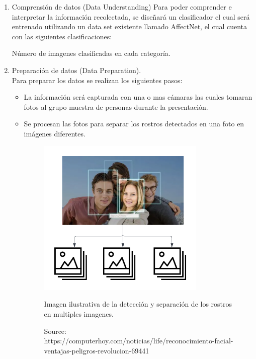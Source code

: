 \begin{enumerate}
      \item Comprensión de datos (Data Understanding) Para poder comprender e interpretar
            la información recolectada, se diseñará un clasificador el cual será entrenado
            utilizando un data set existente llamado
            AffectNet\cite[]{mollahosseini2017affectnet}, el cual cuenta con las siguientes
            clasificaciones:
            \begin{table}[h!]
                  \centering
                  \caption{
                  Número de imagenes clasificadas en cada categoría.
                  {
                  \label{tab:stats_num_data}
                  \cite[]{mollahosseini2017affectnet}
                  }
                  }
                  
            \end{table}
      \item Preparación de datos (Data Preparation). \\Para preparar los datos se realizan
            los siguientes pasos:
            \begin{itemize}
                  \item La información será capturada con una o mas cámaras las cuales tomaran fotos al
                        grupo muestra de personas durante la presentación.
                  \item Se procesan las fotos para separar los rostros detectados en una foto en
                        imágenes diferentes.
                        \begin{figure}[h]
                              \centering
                              \includegraphics[width=8cm]{figures/pictureSplit.png}
                              \caption{Imagen ilustrativa de la detección y separación de los rostros en multiples imagenes.}
                              \caption*{Source: https://computerhoy.com/noticias/life/reconocimiento-facial-ventajas-peligros-revolucion-69441}
                        \end{figure}


\end{itemize}
\end{enumerate}
